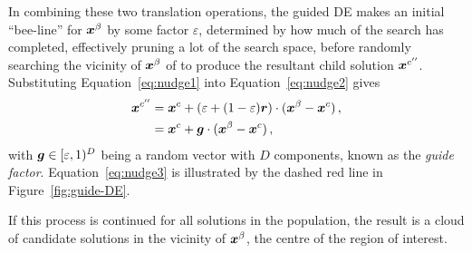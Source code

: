 In combining these two translation operations, the guided DE makes an initial ``bee-line'' for $\boldsymbol{x}^\beta$ by some factor $\varepsilon$, determined by how much of the search has completed, effectively pruning a lot of the search space, before randomly searching the vicinity of $\boldsymbol{x}^\beta$ of to produce the resultant child solution $\boldsymbol{x}^{c''}$. Substituting Equation~\ref{eq:nudge1} into Equation~\ref{eq:nudge2} gives
\begin{align}\label{eq:nudge3}
\boldsymbol{x}^{c''} &= \boldsymbol{x}^{c} + (\varepsilon + (1-\varepsilon)\boldsymbol{r}) \cdot (\boldsymbol{x}^\beta - \boldsymbol{x}^{c})\,,\nonumber\\
& = \boldsymbol{x}^{c} + \boldsymbol{g} \cdot (\boldsymbol{x}^\beta - \boldsymbol{x}^{c})\,,
\end{align}
with $\boldsymbol{g} \in [\varepsilon,1)^D$ being a random vector with $D$ components, known as the \emph{guide factor}. Equation~\ref{eq:nudge3} is illustrated by the dashed red line in Figure~\ref{fig:guide-DE}.

If this process is continued for all solutions in the population, the result is a cloud of candidate solutions in the vicinity of $\boldsymbol{x}^\beta$, the centre of the region of interest.
 
